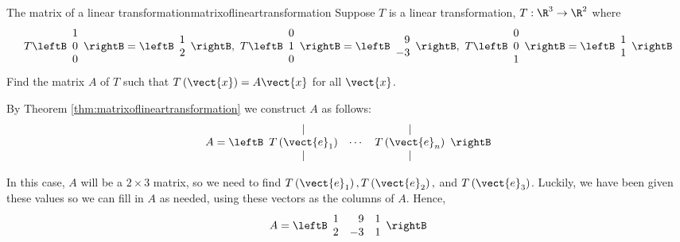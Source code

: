 \begin{example}{The matrix of a linear transformation}{matrixoflineartransformation}
Suppose $T$ is a linear transformation, $T:\R^{3}\rightarrow \R^{2}$ where 
\begin{equation*}
T\leftB
\begin{array}{r}
1 \\
0 \\
0
\end{array}
\rightB =\leftB
\begin{array}{r}
1 \\
2
\end{array}
\rightB ,\ T\leftB
\begin{array}{r}
0 \\
1 \\
0
\end{array}
\rightB =\leftB
\begin{array}{r}
9 \\
-3
\end{array}
\rightB ,\ T\leftB
\begin{array}{r}
0 \\
0 \\
1
\end{array}
\rightB =\leftB
\begin{array}{r}
1 \\
1
\end{array}
\rightB
\end{equation*}
Find the matrix $A$ of $T$ such that $T \left( \vect{x} \right)=A\vect{x}$  for all $\vect{x}$.
\end{example}

\begin{solution} By Theorem \ref{thm:matrixoflineartransformation} we construct $A$ as follows:
\begin{equation*}
A = 
\leftB
\begin{array}{ccc}
| &  & | \\
T\left( \vect{e}_{1}\right) & \cdots & T\left( \vect{e}_{n}\right) \\
| &  & |
\end{array}
\rightB
\end{equation*}

In this case, $A$ will be a $2 \times 3$ matrix, so we need to find $T
\left(\vect{e}_1 \right), T \left(\vect{e}_2 \right),$ and $T \left(\vect{e}_3
\right)$. Luckily, we have been given these values so we can fill in
$A$ as needed, using these vectors as the columns of $A$.  Hence,
\begin{equation*}
A=\leftB
\begin{array}{rrr}
1 & 9 & 1 \\
2 & -3 & 1
\end{array}
\rightB
\end{equation*}
\end{solution}

